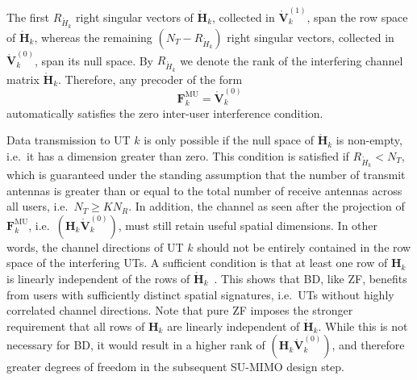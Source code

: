 The first $R_{\mathring{H}_k}$ right singular vectors of $\mathring{\mathbf{H}}_k$, collected in $\mathring{\mathbf{V}}_{k}^{(1)}$, span the row space of $\mathring{\mathbf{H}}_k$, whereas the remaining $(N_T - R_{\mathring{H}_k})$ right singular vectors, collected in $\mathring{\mathbf{V}}_{k}^{(0)}$, span its null space.
By $R_{\mathring{H}_k}$ we denote the rank of the interfering channel matrix $\mathring{\mathbf{H}}_k$.
Therefore, any precoder of the form
\begin{equation}
    \mathbf{F}_k^{\mathrm{MU}} = \mathring{\mathbf{V}}_{k}^{(0)}
\end{equation}
automatically satisfies the zero inter-user interference condition.

Data transmission to \ac{UT} $k$ is only possible if the null space of $\mathring{\mathbf{H}}_k$ is non-empty, i.e.\ it has a dimension greater than zero.
This condition is satisfied if $R_{\mathring{H}_k} < N_T$, which is guaranteed under the standing assumption that the number of transmit antennas is greater than or equal to the total number of receive antennas across all users, i.e.\ $N_T \geq K N_R$.
In addition, the channel as seen after the projection of $\mathbf{F}_k^{\mathrm{MU}}$, i.e.\ $(\mathbf{H}_k \mathring{\mathbf{V}}_{k}^{(0)})$, must still retain useful spatial dimensions.
In other words, the channel directions of \ac{UT} $k$ should not be entirely contained in the row space of the interfering \acp{UT}.
A sufficient condition is that at least one row of $\mathbf{H}_k$ is linearly independent of the rows of $\mathring{\mathbf{H}}_k$~\cite{matrix_analysis_horn_johnson_1985}.
This shows that \ac{BD}, like \ac{ZF}, benefits from users with sufficiently distinct spatial signatures, i.e.\ \acp{UT} without highly correlated channel directions.
Note that pure \ac{ZF} imposes the stronger requirement that all rows of $\mathbf{H}_k$ are linearly independent of $\mathring{\mathbf{H}}_k$.
While this is not necessary for \ac{BD}, it would result in a higher rank of $(\mathbf{H}_k \mathring{\mathbf{V}}_{k}^{(0)})$, and therefore greater degrees of freedom in the subsequent \ac{SU}-\ac{MIMO} design step.

